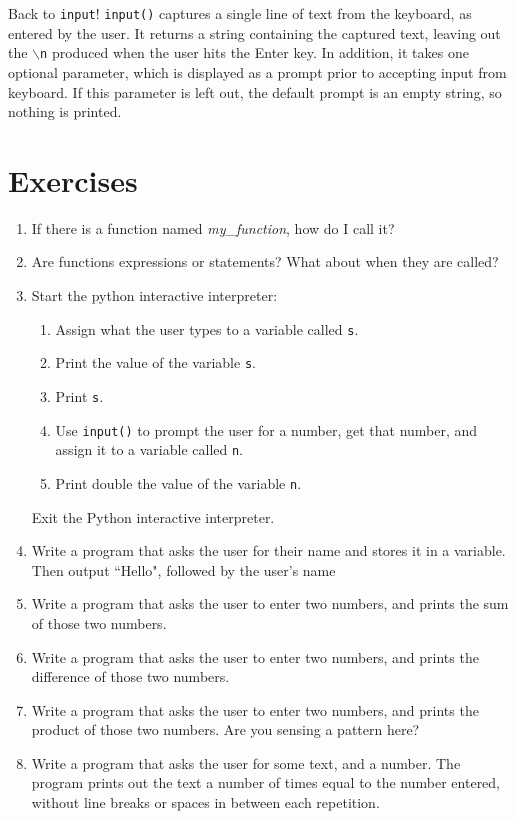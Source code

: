 Back to \texttt{input}! \texttt{input()} captures a single line of text from     the keyboard, as entered by the user. It returns a string containing     the captured text, leaving out the \texttt{$\backslash$n} produced when the user hits the     Enter key. In addition, it takes one optional parameter, which is     displayed as a prompt prior to accepting input from keyboard. If this     parameter is left out, the default prompt is an empty string, so     nothing is printed.

\section{Exercises}
\begin{enumerate}
	\item If there is a function named \textit{my\_function}, how do I call       it?
	\item Are functions expressions or statements? What about when they       are called?
	\item Start the python interactive interpreter:        
\begin{enumerate}
	\item Assign what the user types to a variable called           \texttt{s}.
	\item Print the value of the variable \texttt{s}.
	\item Print \texttt{s}.
	\item Use \texttt{input()} to prompt the user for a number, get that number, and assign it to a variable called \texttt{n}.
	\item Print double the value of the variable \texttt{n}.
\end{enumerate}        Exit the Python interactive interpreter.      
	\item Write a program that asks the user for their name and       stores it in a variable. Then output ``Hello", followed by the       user's name
	\item Write a program that asks the user to enter two numbers, and       prints the sum of those two numbers.
	\item Write a program that asks the user to enter two numbers, and       prints the difference of those two numbers.
	\item Write a program that asks the user to enter two numbers, and       prints the product of those two numbers. Are you sensing a pattern       here?
	\item Write a program that asks the user for some text, and a number.       The program prints out the text a number of times equal to the       number entered, without line breaks or spaces in between each       repetition.
\end{enumerate}   
